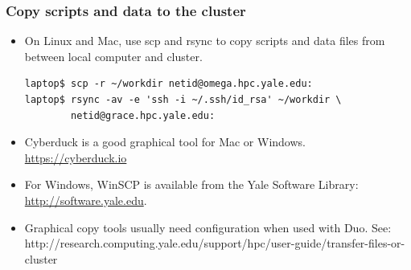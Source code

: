 \documentclass[10pt]{beamer}
\begin{document}

\begin{frame}[fragile]
\frametitle{Copy scripts and data to the cluster}
\begin{itemize}
\item On Linux and Mac, use scp and rsync
to copy scripts and data files from between local computer and cluster.

\begin{verbatim}
laptop$ scp -r ~/workdir netid@omega.hpc.yale.edu:
laptop$ rsync -av -e 'ssh -i ~/.ssh/id_rsa' ~/workdir \
        netid@grace.hpc.yale.edu:
\end{verbatim}

\item Cyberduck is a good graphical tool for Mac or Windows.  \url{https://cyberduck.io}

\item For Windows, WinSCP is available from the Yale Software
Library: \url{http://software.yale.edu}.

\item Graphical copy tools usually need configuration when used with Duo.  See:
http://research.computing.yale.edu/support/hpc/user-guide/transfer-files-or-cluster
\end{itemize}

\end{frame}
\end{document}
